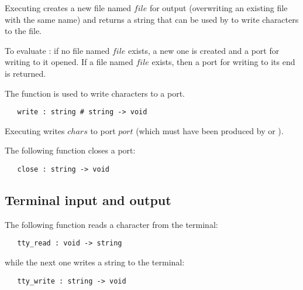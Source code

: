 \noindent Executing  creates a new file named $file$ for
output (overwriting an existing file with the same name) and returns a string
that can be used by  to write characters to the file.

To evaluate : if no file named $file$ exists, a new
one is created and a port for writing to it opened. If a file named $file$
exists, then a port for writing to its end is returned.

The function  is used to write characters to a port.

\begin{boxed}
\begin{verbatim}
   write : string # string -> void
\end{verbatim}\end{boxed}

\noindent Executing  writes $chars$ to port
$port$ (which must have been produced by  or ).

The following function closes a port:

\begin{boxed}
\begin{verbatim}
   close : string -> void
\end{verbatim}\end{boxed}

\subsection{Terminal input and output}

The following function reads a character from the terminal:

\begin{boxed}
\begin{verbatim}
   tty_read : void -> string
\end{verbatim}\end{boxed}

\noindent while the next one writes a string to the terminal:

\begin{boxed}
\begin{verbatim}
   tty_write : string -> void
\end{verbatim}\end{boxed}




